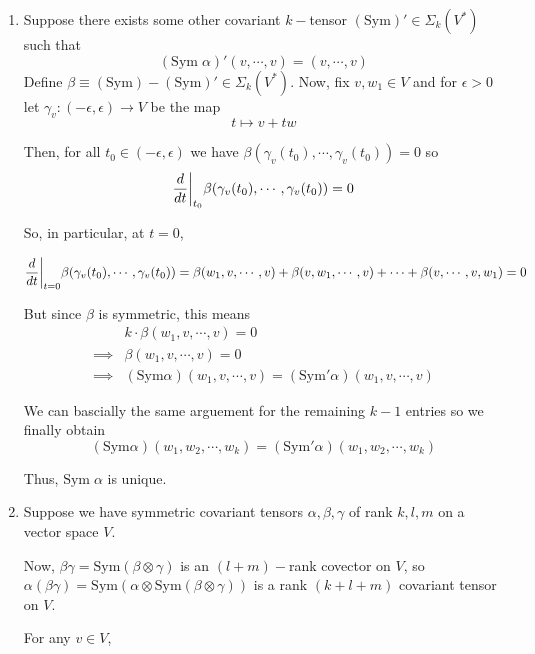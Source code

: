 \documentclass{article}
\newcommand{\restr}[2]{{%
  \left.\kern-\nulldelimiterspace %
  #1 %
  \vphantom{\big|} %
  \right|_{#2} %
  }}
\begin{document}
\begin{enumerate}[label=(\alph*)]
  \item Suppose there exists some other covariant $k-$tensor $\left(\mathrm{Sym}\right)' \in \Sigma_{k}(V^*)$ such that 
  \[ \left(\mathrm{Sym} \; \alpha\right)'(v, \cdots, v) = (v, \cdots, v) \] Define $\beta \equiv \left(\mathrm{Sym}\right) - \left(\mathrm{Sym}\right)' \in \Sigma_{k}(V^*)$. Now, fix $v, w_1 \in V$ and for $\epsilon > 0$ let $\gamma_v :(-\epsilon, \epsilon) \rightarrow V$ be the map
  \[ t \mapsto v + tw \]

  Then, for all $t_0 \in (-\epsilon, \epsilon)$ we have $\beta(\gamma_v(t_0), \cdots, \gamma_v(t_0)) = 0$ so 
  \[ \restr{\frac{d}{dt}}{t_0} \beta(\gamma_v(t_0), \cdots, \gamma_v(t_0)) = 0  \]

  So, in particular, at $t = 0$,

\begin{align*}
  \restr{\frac{d}{dt}}{t = 0} \beta(\gamma_v(t_0), \cdots, \gamma_v(t_0)) = \beta(w_1, v, \cdots, v) + \beta(v, w_1, \cdots, v) + \cdots + \beta(v, \cdots, v, w_1) = 0
\end{align*}

But since $\beta$ is symmetric, this means 
\begin{align*}
  &k\cdot\beta(w_1, v, \cdots, v) = 0 \\
  \implies&\beta(w_1, v, \cdots, v) = 0 \\
  \implies&(\mathrm{Sym} \alpha)(w_1, v, \cdots, v) = (\mathrm{Sym}' \alpha)(w_1, v, \cdots, v)
\end{align*}

We can bascially the same arguement for the remaining $k-1$ entries so we finally obtain 
\[ (\mathrm{Sym} \alpha)(w_1, w_2, \cdots, w_k) = (\mathrm{Sym}' \alpha)(w_1, w_2, \cdots, w_k) \]

Thus, $\mathrm{Sym}\;\alpha$ is unique.

\vskip 0.5cm
\item Suppose we have symmetric covariant tensors $\alpha, \beta, \gamma$ of rank $k, l, m$ on a vector space $V$. 

Now, $\beta \gamma = \mathrm{Sym}(\beta \otimes \gamma)$ is an $(l+m)-$rank covector on $V$, so $\alpha (\beta \gamma) = \mathrm{Sym}\left(\alpha \otimes \mathrm{Sym}(\beta \otimes \gamma)\right)$ is a rank $(k+l+m)$ covariant tensor on $V$.

For any $v \in V$, 


\end{enumerate}
\end{document}
